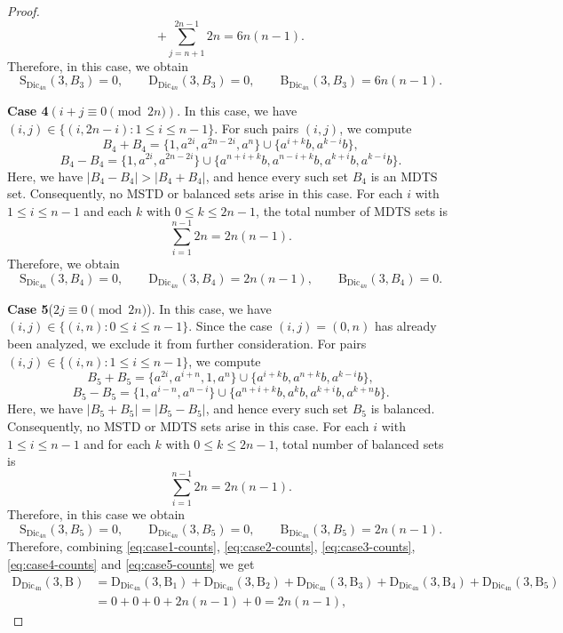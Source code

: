 \documentclass[11pt,reqno]{amsart}
\numberwithin{equation}{section}
\begin{document}
\begin{proof}
$$+\sum_{j=n+1}^{2n-1}2n
=6n(n-1).
$$
Therefore, in this case, we obtain
\begin{equation}\label{eq:case3-counts}
\mathrm{S}_{\mathrm{Dic}_{4n}}(3,B_3)=0, \qquad 
\mathrm{D}_{\mathrm{Dic}_{4n}}(3,B_3)=0, \qquad 
\mathrm{B}_{\mathrm{Dic}_{4n}}(3,B_3)=6n(n-1).
\end{equation}\par
\textbf{Case 4}$(i+j\equiv 0 \pmod{2n})$. In this case, we have  $(i,j)\in \{(i,2n-i): 1\leq i\leq n-1\}$. For such pairs $(i,j)$,  we compute 
$$B_{4}+B_{4}=\{1,a^{2i},a^{2n-2i},a^n\}\cup\{a^{i+k}b,a^{k-i}b\},$$ 
$$B_{4}-B_{4}=\{1,a^{2i},a^{2n-2i}\}\cup \{a^{n+i+k}b,a^{n-i+k}b,a^{k+i}b,a^{k-i}b\}.$$
Here, we have $|B_{4}-B_{4}|>|B_{4}+B_{4}|$, and hence every such set $B_4$ is an MDTS set. Consequently, no MSTD or balanced sets arise in this case. For each $i$ with $1\le i\le n-1$ and each $k$ with $0\le k\le 2n-1$, the total number of MDTS sets is
$$
\sum_{i=1}^{n-1}2n=2n(n-1).
$$ Therefore, we obtain \begin{equation}\label{eq:case4-counts}
\mathrm{S}_{\mathrm{Dic}_{4n}}(3,B_4)=0, \qquad 
\mathrm{D}_{\mathrm{Dic}_{4n}}(3,B_4)=2n(n-1), \qquad 
\mathrm{B}_{\mathrm{Dic}_{4n}}(3,B_4)=0.
\end{equation}\par
\textbf{Case 5}($2j\equiv 0 \pmod{2n}$). In this case, we have  $(i,j)\in\{(i,n):0\leq i \leq n-1\}$. Since the case $(i,j)=(0,n)$ has already been analyzed,  we exclude it from further consideration. For pairs $(i,j)\in\{(i,n):1\leq i \leq n-1\}$, we compute
$$B_5+B_5=\{a^{2i},a^{i+n},1,a^{n}\}\cup
\{a^{i+k}b,a^{n+k}b,a^{k-i}b\},$$
$$B_5-B_5=\{1,a^{i-n},a^{n-i}\}\cup
\{a^{n+i+k}b,a^{k}b,a^{k+i}b,a^{k+n}b\}.$$
Here, we have $|B_5+B_5|=|B_5-B_5|$, and hence every such set $B_5$ is balanced. Consequently, no MSTD or MDTS sets arise in this case. For each $i$ with $1\le i\le n-1$ and for each $k$ with $0\le k\le 2n-1$,  total number of balanced sets is
$$\sum_{i=1}^{n-1}2n=2n(n-1).$$
Therefore, in this case we obtain
\begin{equation}\label{eq:case5-counts}
\mathrm{S}_{\mathrm{Dic}_{4n}}(3,B_5)=0, \qquad 
\mathrm{D}_{\mathrm{Dic}_{4n}}(3,B_5)=0, \qquad 
\mathrm{B}_{\mathrm{Dic}_{4n}}(3,B_5)=2n(n-1).
\end{equation}
Therefore, combining \eqref{eq:case1-counts}, \eqref{eq:case2-counts}, \eqref{eq:case3-counts}, \eqref{eq:case4-counts} and \eqref{eq:case5-counts} we get 
\begin{align*}
\mathrm{D_{\mathrm{Dic_{4n}}}(3,B)}&=\mathrm{D_{\mathrm{Dic_{4n}}}(3,B_1)}+\mathrm{D_{\mathrm{Dic_{4n}}}(3,B_2)}+\mathrm{D_{\mathrm{Dic_{4n}}}(3,B_3)}+\mathrm{D_{\mathrm{Dic_{4n}}}(3,B_4)}+\mathrm{D_{\mathrm{Dic_{4n}}}(3,B_5)}\\&=0+0+0+2n(n-1)+0=2n(n-1),\end{align*}

\end{proof}
\end{document}
